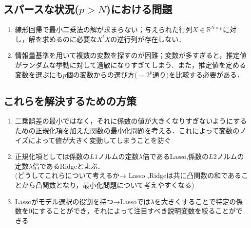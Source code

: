 \documentclass{jsarticle}
\theoremstyle{definition}
\begin{document}
\large
\subsection*{スパースな状況($p>N$)における問題}
\begin{enumerate}[・]
\item 線形回帰で最小二乗法の解が求まらない；与えられた行列$X\in\mathbb{R}^{N\times p}$に対し，解を求めるのに必要な$X^t X$の逆行列が存在しない．\\

\item 情報量基準を用いて複数の変数を探すのが困難；変数が多すぎると，推定値がランダムな挙動に対して過敏になりすぎてしまう．また，推定値を定める変数を選ぶにも$p$個の変数からの選び方($=2^p通り)$を比較する必要がある．
\end{enumerate}
\subsection*{これらを解決するための方策}
\begin{enumerate}[・]
\item 二乗誤差の最小ではなく，それに係数の値が大きくなりすぎないようにするための正規化項を加えた関数の最小化問題を考える．これによって変数のノイズによって値が大きく変動してしまうことを防ぐ\\

\item 正規化項としては係数の$L1$ノルムの定数$\lambda$倍であるLasso,係数の$L2$ノルムの定数$\lambda$倍であるRidgeとよぶ．\\
(どうしてこれらについて考えるか→ Lasso ,Ridgeは共に凸関数の和であることから凸関数となり，最小化問題について考えやすくなる)\\

\item Lassoがモデル選択の役割を持つ→Lassoでは$\lambda$を大きくすることで特定の係数を$0$にすることができ，それによって注目すべき説明変数を絞ることができる

\end{enumerate}
\end{document}
